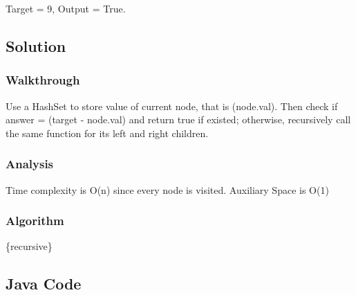 \documentclass[]{book}
\begin{document}
Target = 9, Output = True.

\hypertarget{solution-1}{%
\subsection{Solution}\label{solution-1}}

\hypertarget{walkthrough-3}{%
\subsubsection{Walkthrough}\label{walkthrough-3}}

Use a HashSet to store value of current node, that is (node.val). Then check if answer = (target - node.val)
and return true if existed; otherwise, recursively call the same function for its left and right children.

\hypertarget{analysis-3}{%
\subsubsection{Analysis}\label{analysis-3}}

Time complexity is O(n) since every node is visited. Auxiliary Space is O(1)

\hypertarget{algorithm-3}{%
\subsubsection{Algorithm}\label{algorithm-3}}

\{recursive\}

\hypertarget{java-code-1}{%
\subsection{Java Code}\label{java-code-1}}
\end{document}
